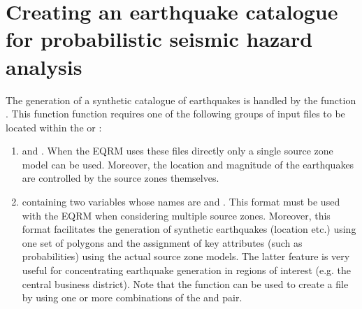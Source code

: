 \section{Creating an earthquake catalogue for probabilistic seismic hazard analysis}%
\label{sec:source-EQcat}


The generation of a synthetic catalogue of earthquakes is handled
by the function . This function function
requires one of the following groups of input files to be located
within the  or
:
\begin{enumerate}
\item {}
and . When
the EQRM uses these files directly only a single source zone model
can be used. Moreover, the location and magnitude of the
earthquakes are controlled by the source zones themselves. \item
{} containing
two variables whose names are  and
. This format must be used with the EQRM when
considering multiple source zones. Moreover, this format
facilitates the generation of synthetic earthquakes (location
etc.) using one set of polygons and the assignment of key
attributes (such as probabilities) using the actual source zone
models. The latter feature is very useful for concentrating
earthquake generation in regions of interest (e.g. the central
business district). Note that the function
 can be used to create a
 file by using one
or more combinations of the
 and
 pair.
\end{enumerate}


